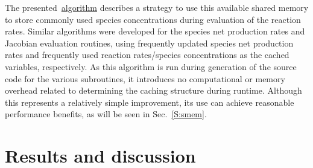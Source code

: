 \documentclass[preprint]{elsarticle}
\begin{document}
The presented~\hyperref[A:shared_mem_caching]{algorithm} describes a strategy to use this available shared memory to store commonly used species concentrations during evaluation of the reaction rates.
Similar algorithms were developed for the species net production rates and Jacobian evaluation routines, using frequently updated species net production rates and frequently used reaction rates\slash species concentrations as the cached variables, respectively.
As this algorithm is run during generation of the source code for the various subroutines, it introduces no computational or memory overhead related to determining the caching structure during runtime.
Although this represents a relatively simple improvement, its use can achieve reasonable performance benefits, as will be seen in Sec.~\ref{S:smem}.

\section{Results and discussion}
\end{document}
